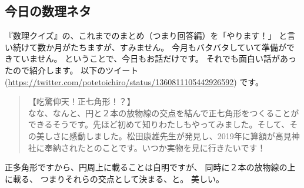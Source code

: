 \documentclass[dvipdfmx,autodetect-engine,10pt,b5paper,papersize,openany,dvipsnames]{jsbook}
\begin{document}
\begin{multicols}{2}

\vspace{15cm}

\section{今日の数理ネタ}
『数理クイズ』の、これまでのまとめ（つまり回答編）を「やります！」
と言い続けて数か月がたちますが、すみません。
今月もバタバタしていて準備ができていません。
ということで、今日もお話だけです。
それでも面白い話があったので紹介します。
以下のツイート
(\url{https://twitter.com/potetoichiro/status/1360811105442926592})
です。
\begin{quotation}
  \noindent
  【吃驚仰天！正七角形！？】\\
  なな、なんと、円と２本の放物線の交点を結んで正七角形をつくることができるそうです。先ほど初めて知りわたしもやってみました。そして、その美しさに感動しました。松田康雄先生が発見し、2019年に算額が高見神社に奉納されたとのことです。いつか実物を見に行きたいです！
\end{quotation}
正多角形ですから、円周上に載ることは自明ですが、
同時に２本の放物線の上に載る、
つまりそれらの交点として決まる、と。
美しい。


\end{multicols}
\end{document}
